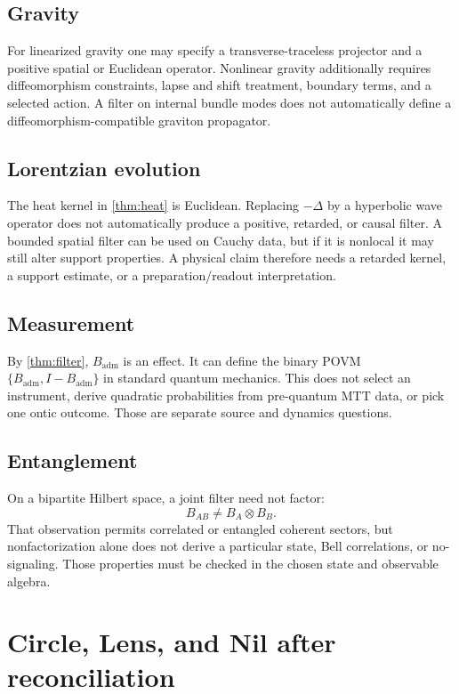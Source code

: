 \documentclass[11pt]{article}
\theoremstyle{definition}
\theoremstyle{remark}
\newcommand{\Badm}{B_{\mathrm{adm}}}
\newcommand{\Id}{I}
\begin{document}
\subsection{Gravity}

For linearized gravity one may specify a transverse-traceless projector and
a positive spatial or Euclidean operator. Nonlinear gravity additionally
requires diffeomorphism constraints, lapse and shift treatment, boundary
terms, and a selected action. A filter on internal bundle modes does not
automatically define a diffeomorphism-compatible graviton propagator.

\subsection{Lorentzian evolution}

The heat kernel in \autoref{thm:heat} is Euclidean. Replacing \(-\Delta\) by a
hyperbolic wave operator does not automatically produce a positive,
retarded, or causal filter. A bounded spatial filter can be used on Cauchy
data, but if it is nonlocal it may still alter support properties. A physical
claim therefore needs a retarded kernel, a support estimate, or a
preparation/readout interpretation.

\subsection{Measurement}

By \autoref{thm:filter}, \(\Badm\) is an effect. It can define the binary POVM
\(\{\Badm,\Id-\Badm\}\) in standard quantum mechanics. This does not select
an instrument, derive quadratic probabilities from pre-quantum MTT data, or
pick one ontic outcome. Those are separate source and dynamics questions.

\subsection{Entanglement}

On a bipartite Hilbert space, a joint filter need not factor:
\[
 B_{AB}\neq B_A\otimes B_B.
\]
That observation permits correlated or entangled coherent sectors, but
nonfactorization alone does not derive a particular state, Bell
correlations, or no-signaling. Those properties must be checked in the
chosen state and observable algebra.

\section{Circle, Lens, and Nil after reconciliation}
\end{document}
